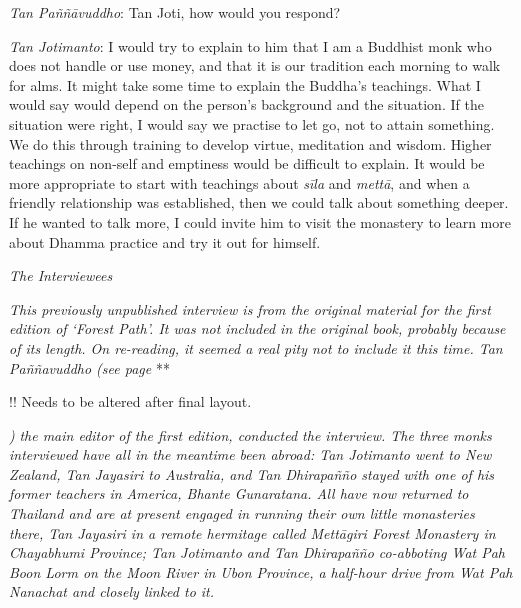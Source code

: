 \emph{Tan Paññāvuddho}‎: Tan Joti, how would you respond?

\emph{Tan Jotimanto}: I would try to explain to him that I am a Buddhist
monk who does not handle or use money, and that it is our tradition each
morning to walk for alms. It might take some time to explain the
Buddha's teachings. What I would say would depend on the person's
background and the situation. If the situation were right, I would say
we practise to let go, not to attain something. We do this through
training to develop virtue, meditation and wisdom. Higher teachings on
non-self and emptiness would be difficult to explain. It would be more
appropriate to start with teachings about \emph{sīla} and \emph{mettā},
and when a friendly relationship was established, then we could talk
about something deeper. If he wanted to talk more, I could invite him to
visit the monastery to learn more about Dhamma practice and try it out
for himself.

\emph{The Interviewees}

\emph{This previously unpublished interview is from the original
material for the first edition of `Forest Path'. It was not included in
the original book, probably because of its length. On re-reading, it
seemed a real pity not to include it this time. Tan Paññavuddho (see
page} **

!! Needs to be altered after final layout.

\emph{)} \emph{the main editor of the first edition, conducted the
interview. The three monks interviewed have all in the meantime been
abroad: Tan Jotimanto went to New Zealand, Tan Jayasiri to Australia,
and Tan Dhirapañño stayed with one of his former teachers in America,
Bhante Gunaratana. All have now returned to Thailand and are at present
engaged in running their own little monasteries there, Tan Jayasiri in a
remote hermitage called Mettāgiri Forest Monastery in Chayabhumi
Province; Tan Jotimanto and Tan Dhirapañño co-abboting Wat Pah Boon Lorm
on the Moon River in Ubon Province, a half-hour drive from Wat Pah
Nanachat and closely linked to it.}

